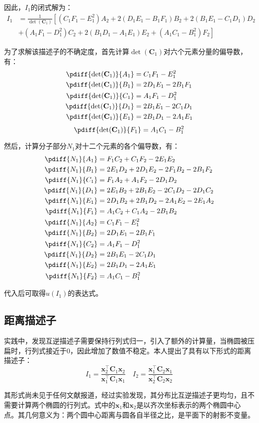 \documentclass{article}
\begin{document}
因此，$I_1$的闭式解为：
\begin{align*}
  I_1&=\frac{1}{\det(\mathbf{C}_1)}\left[(C_1F_1-E_1^2)A_2+2(D_1E_1-B_1F_1)B_2+2(B_1E_1-C_1D_1)D_2\right.\\
  &\left.+(A_1F_1-D_1^2)C_2+2(B_1D_1-A_1E_1)E_2+(A_1C_1-B_1^2)F_2\right]
\end{align*}\par
为了求解该描述子的不确定度，首先计算$\det(\mathbf{C}_1)$对六个元素分量的偏导数，有：
\begin{align*}
  \pdiff{\det(\mathbf{C}_1)}{A_1}&=C_1F_1-E_1^2\\
  \pdiff{\det(\mathbf{C}_1)}{B_1}&=2D_1E_1-2B_1F_1\\
  \pdiff{\det(\mathbf{C}_1)}{C_1}&=A_1F_1-D_1^2\\
  \pdiff{\det(\mathbf{C}_1)}{D_1}&=2B_1E_1-2C_1D_1\\
  \pdiff{\det(\mathbf{C}_1)}{E_1}&=2B_1D_1-2A_1E_1
\end{align*}
\begin{equation*}
  \pdiff{\det(\mathbf{C}_1)}{F_1}=A_1C_1-B_1^2
\end{equation*}\par
然后，计算分子部分$N_1$对十二个元素的各个偏导数，有：
\begin{align*}
  \pdiff{N_1}{A_1}&=F_1C_2+C_1F_2-2E_1E_2\\
  \pdiff{N_1}{B_1}&=2E_1D_2+2D_1E_2-2F_1B_2-2B_1F_2\\
  \pdiff{N_1}{C_1}&=F_1A_2+A_1F_2-2D_1D_2\\
  \pdiff{N_1}{D_1}&=2E_1B_2+2B_1E_2-2C_1D_2-2D_1C_2\\
  \pdiff{N_1}{E_1}&=2D_1B_2+2B_1D_2-2A_1E_2-2E_1A_2\\
  \pdiff{N_1}{F_1}&=A_1C_2+C_1A_2-2B_1B_2\\
  \pdiff{N_1}{A_2}&=C_1F_1-E_1^2\\
  \pdiff{N_1}{B_2}&=2D_1E_1-2B_1F_1\\
  \pdiff{N_1}{C_2}&=A_1F_1-D_1^2\\
  \pdiff{N_1}{D_2}&=2B_1E_1-2C_1D_1\\
  \pdiff{N_1}{E_2}&=2B_1D_1-2A_1E_1\\
  \pdiff{N_1}{F_2}&=A_1C_1-B_1^2
\end{align*}\par
代入后可取得$u(I_1)$的表达式。
\subsection{距离描述子}
实践中，发现互逆描述子需要保持行列式归一，引入了额外的计算量，当椭圆被压扁时，行列式接近于0，因此增加了数值不稳定。本人提出了具有以下形式的距离描述子：
\begin{equation*}
  I_1 = \frac{\mathbf{x}_2^\top\mathbf{C}_1\mathbf{x}_2}{\mathbf{x}_1^\top\mathbf{C}_1\mathbf{x}_1}\quad I_2 = \frac{\mathbf{x}_1^\top\mathbf{C}_2\mathbf{x}_1}{\mathbf{x}_2^\top\mathbf{C}_2\mathbf{x}_2}
\end{equation*}\par
其形式尚未见于任何文献报道，经过实验发现，其分布比互逆描述子更均匀，且不需要计算两个椭圆的行列式。式中的$\mathbf{x}_1$和$\mathbf{x}_2$是以齐次坐标表示的两个椭圆中心点。其几何意义为：两个圆中心距离与圆各自半径之比，是平面下的射影不变量。
\newpage
\printbibliography[heading=bibliography,title=参考文献]
\end{document}
